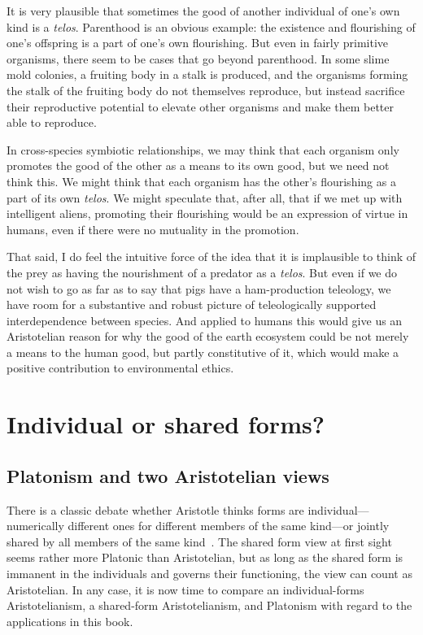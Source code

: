 It is very plausible that sometimes the good of another individual of one's own kind is a \textit{telos}.
Parenthood is an obvious example: the existence and flourishing of one's offspring is a part of one's
own flourishing. But even in fairly primitive organisms, there seem to be cases that go beyond parenthood.
In some slime mold colonies, a fruiting body in a stalk is produced, and the organisms forming the stalk of the fruiting body do
not themselves reproduce, but instead sacrifice their reproductive potential to elevate other organisms
and make them better able to reproduce. 

In cross-species symbiotic relationships, we may think that each organism only promotes the good of the 
other as a means to its own good, but we need not think this. We might think that each organism has the
other's flourishing as a part of its own \textit{telos}. We might speculate that, after all, that if we
met up with intelligent aliens, promoting their flourishing would be an expression of virtue in
humans, even if there were no mutuality in the promotion.

That said, I do feel the intuitive force of the idea that it is implausible to think of the prey as having the
nourishment of a predator as a \textit{telos}. But even if we do not wish to go as far as to say that pigs
have a ham-production teleology, we have room for a substantive and robust picture of teleologically supported
interdependence between species. And applied to humans this would give us an Aristotelian reason for why the good of the earth ecosystem 
could be not merely a means to the human good, but partly constitutive of it, which would make a positive
contribution to environmental ethics. 

\section{Individual or shared forms?}\label{sec:indform}
\subsection{Platonism and two Aristotelian views}
There is a classic debate whether Aristotle thinks forms are individual---numerically different ones for different members of 
the same kind---or jointly shared by all members of the same kind~\parencite{LesherAristotle,HartmanAristotle,FineAristotle}. The shared form view at first sight seems rather 
more Platonic than Aristotelian, but as long as the shared form is immanent in the individuals and governs their functioning, the view can count as Aristotelian. In any case, it is now time to compare an individual-forms Aristotelianism,
a shared-form Aristotelianism, and Platonism with regard to the applications in this book. 

